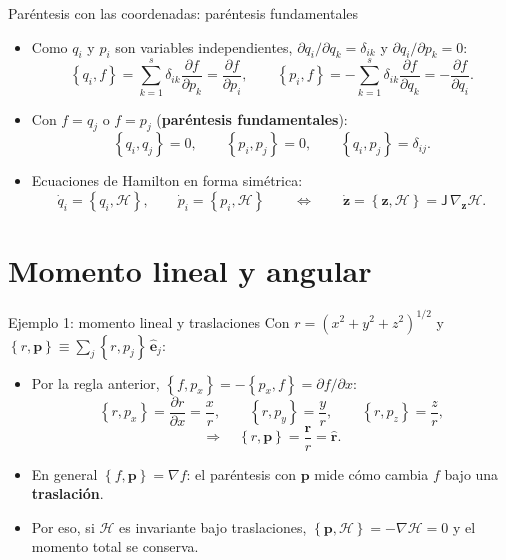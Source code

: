 \documentclass[spanish]{beamer}
\newcommand{\Ham}{\mathcal{H}}
\newcommand{\pd}[2]{\frac{\partial #1}{\partial #2}}
\newcommand{\pb}[2]{\left\{#1,#2\right\}}   %
\newcommand{\J}{\mathsf{J}}                  %
\begin{document}
\begin{frame}{Paréntesis con las coordenadas: paréntesis fundamentales}
\begin{itemize}
  \item<1-> Como $q_i$ y $p_i$ son variables independientes,
        $\partial q_i/\partial q_k = \delta_{ik}$ y $\partial q_i/\partial p_k = 0$:
  \[
    \pb{q_i}{f} = \sum_{k=1}^{s}\delta_{ik}\pd{f}{p_k} = \pd{f}{p_i},
    \qquad
    \pb{p_i}{f} = -\sum_{k=1}^{s}\delta_{ik}\pd{f}{q_k} = -\pd{f}{q_i}.
  \]
  \item<2-> Con $f = q_j$ o $f = p_j$ (\textbf{paréntesis fundamentales}):
  \[
    \pb{q_i}{q_j} = 0, \qquad \pb{p_i}{p_j} = 0, \qquad \pb{q_i}{p_j} = \delta_{ij} .
  \]
  \item<3-> Ecuaciones de Hamilton en forma simétrica:
  \[
    \dot q_i = \pb{q_i}{\Ham}, \qquad \dot p_i = \pb{p_i}{\Ham}
    \qquad\Longleftrightarrow\qquad
    \dot{\mathbf z} = \pb{\mathbf z}{\Ham} = \J\,\nabla_{\mathbf z}\Ham .
  \]
\end{itemize}
\end{frame}

\section{Momento lineal y angular}

\begin{frame}{Ejemplo 1: momento lineal y traslaciones}
Con $r = (x^2+y^2+z^2)^{1/2}$ y $\pb{r}{\mathbf p} \equiv \sum_j \pb{r}{p_j}\,\hat{\mathbf e}_j$:
\begin{itemize}
  \item<2-> Por la regla anterior, $\pb{f}{p_x} = -\pb{p_x}{f} = \partial f/\partial x$:
  \[
    \pb{r}{p_x} = \pd{r}{x} = \frac{x}{r},\qquad
    \pb{r}{p_y} = \frac{y}{r},\qquad
    \pb{r}{p_z} = \frac{z}{r},
  \]
  \[
    \Rightarrow\quad \pb{r}{\mathbf p} = \frac{\mathbf r}{r} = \hat{\mathbf r} .
  \]
  \item<3-> En general $\pb{f}{\mathbf p} = \nabla f$: el paréntesis con $\mathbf p$
        mide cómo cambia $f$ bajo una \textbf{traslación}.
  \item<4-> Por eso, si $\Ham$ es invariante bajo traslaciones,
        $\pb{\mathbf p}{\Ham} = -\nabla\Ham = 0$ y el momento total se conserva.
\end{itemize}
\end{frame}
\end{document}
